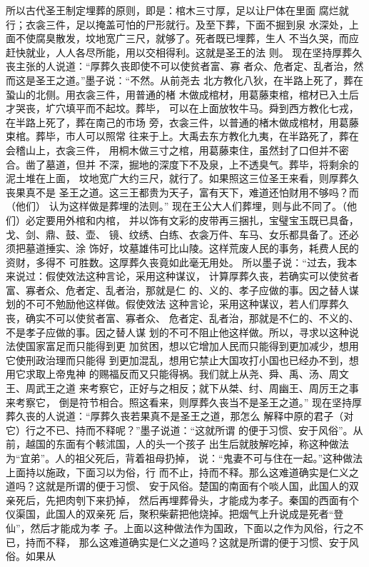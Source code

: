 \documentclass[12pt,UTF8]{ctexbook}
\begin{document}
所以古代圣王制定埋葬的原则，即是：棺木三寸厚，足以让尸体在里面 
腐烂就行；衣衾三件，足以掩盖可怕的尸形就行。及至下葬，下面不掘到泉 
水深处，上面不使腐臭散发，坟地宽广三尺，就够了。死者既已埋葬，生人 
不当久哭，而应赶快就业，人人各尽所能，用以交相得利。这就是圣王的法 
则。 
现在坚持厚葬久丧主张的人说道：“厚葬久丧即使不可以使贫者富、寡 
者众、危者定、乱者治，然而这是圣王之道。”墨子说：“不然。从前尧去 
北方教化八狄，在半路上死了，葬在蛩山的北侧。用衣衾三件，用普通的楮 
木做成棺材，用葛藤束棺，棺材已入土后才哭丧，圹穴填平而不起坟。葬毕， 
可以在上面放牧牛马。舜到西方教化七戎，在半路上死了，葬在南己的市场 
旁，衣衾三件，以普通的楮木做成棺材，用葛藤束棺。葬毕，市人可以照常 
往来于上。大禹去东方教化九夷，在半路死了，葬在会稽山上，衣衾三件， 
用桐木做三寸之棺，用葛藤束住，虽然封了口但并不密合。凿了墓道，但并 
不深，掘地的深度下不及泉，上不透臭气。葬毕，将剩余的泥土堆在上面， 
坟地宽广大约三尺，就行了。如果照这三位圣王来看，则厚葬久丧果真不是 
圣王之道。这三王都贵为天子，富有天下，难道还怕财用不够吗？而（他们） 
认为这样做是葬埋的法则。” 
现在王公大人们葬埋，则与此不同了。（他们）必定要用外棺和内棺， 
并以饰有文彩的皮带再三捆扎，宝璧宝玉既已具备，戈、剑、鼎、鼓、壶、 
镜、纹绣、白练、衣衾万件、车马、女乐都具备了。还必须把墓道捶实、涂 
饰好，坟墓雄伟可比山陵。这样荒废人民的事务，耗费人民的资财，多得不 
可胜数。这厚葬久丧竟如此毫无用处。 
所以墨子说：“过去，我本来说过：假使效法这种言论，采用这种谋议， 
计算厚葬久丧，若确实可以使贫者富、寡者众、危者定、乱者治，那就是仁 
的、义的、孝子应做的事。因之替人谋划的不可不勉励他这样做。假使效法 
这种言论，采用这种谋议，若人们厚葬久丧，确实不可以使贫者富、寡者众、 
危者定、乱者治，那就是不仁的、不义的、不是孝子应做的事。因之替人谋 
划的不可不阻止他这样做。所以，寻求以这种说法使国家富足而只能得到更 
加贫困，想以它增加人民而只能得到更加减少，想用它使刑政治理而只能得 
到更加混乱，想用它禁止大国攻打小国也已经办不到，想用它求取上帝鬼神 
的赐福反而又只能得祸。我们就上从尧、舜、禹、汤、周文王、周武王之道 
来考察它，正好与之相反；就下从桀、纣、周幽王、周厉王之事来考察它， 
倒是符节相合。照这看来，则厚葬久丧当不是圣王之道。” 
现在坚持厚葬久丧的人说道：“厚葬久丧若果真不是圣王之道，那怎么 
解释中原的君子（对它）行之不已、持而不释呢？”墨子说道：“这就所谓 
的便于习惯、安于风俗”。从前，越国的东面有个輆沭国，人的头一个孩子 
出生后就肢解吃掉，称这种做法为“宜弟”。人的祖父死后，背着祖母扔掉， 
说：“鬼妻不可与住在一起。”这种做法上面持以施政，下面习以为俗，行 
而不止，持而不释。那么这难道确实是仁义之道吗？这就是所谓的便于习惯、 
安于风俗。楚国的南面有个啖人国，此国人的双亲死后，先把肉刳下来扔掉， 
然后再埋葬骨头，才能成为孝子。秦国的西面有个仪渠国，此国人的双亲死 
后，聚积柴薪把他烧掉。把烟气上升说成是死者“登仙”，然后才能成为孝 
子。上面以这种做法作为国政，下面以之作为风俗，行之不已，持而不释， 
那么这难道确实是仁义之道吗？这就是所谓的便于习惯、安于风俗。如果从 
\end{document}
